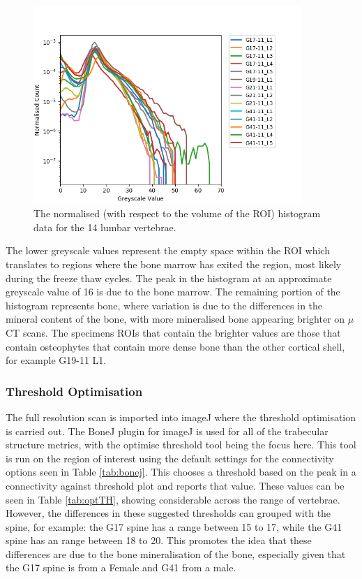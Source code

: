 \begin{figure}[ht!]
  \centering
  \includegraphics[width=4in]{Chapters/Chapter_HT_images/Normalised_Histogram.png}
  \caption{The normalised (with respect to the volume of the ROI) histogram data
    for the 14 lumbar vertebrae.}
  \label{fig:normalisedhistogram}
\end{figure}

The lower greyscale values represent the empty space within the ROI which
translates to regions where the bone marrow has exited the region, most likely
during the freeze thaw cycles. The peak in the histogram at an approximate
greyscale value of 16 is due to the bone marrow. The remaining portion of the
histogram represents bone, where variation is due to the differences in the
mineral content of the bone, with more mineralised bone appearing brighter on
$\mu$CT scans. The specimens ROIs that contain the brighter values are those
that contain osteophytes that contain more dense bone than the other cortical
shell, for example G19-11 L1.

\subsubsection{Threshold Optimisation}


The full resolution scan is imported into imageJ where the threshold
optimisation is carried out. The BoneJ plugin for imageJ is used for all of the
trabecular structure metrics, with the optimise threshold tool being the focus
here. This tool is run on the region of interest using the default settings for
the connectivity options seen in Table \ref{tab:bonej}. This chooses a threshold
based on the peak in a connectivity against threshold plot and reports that
value. These values can be seen in Table \ref{tab:optTH}, showing considerable
across the range of vertebrae. However, the differences in these suggested
thresholds can grouped with the spine, for example: the G17 spine has a range
between 15 to 17, while the G41 spine has an range between 18 to 20. This
promotes the idea that these differences are due to the bone mineralisation of
the bone, especially given that the G17 spine is from a Female and G41 from a
male.

